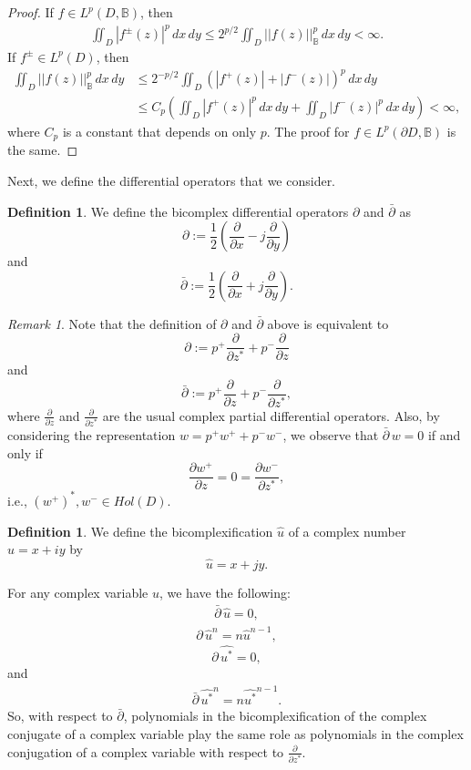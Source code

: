 \documentclass[suppldata]{interact}
\theoremstyle{plain}%
\theoremstyle{definition}
\newtheorem{deff}[theorem]{Definition}
\theoremstyle{remark}
\newtheorem{comm}{Remark}
\newcommand{\p}{\partial}
\newcommand{\dbar}{\bar\partial}
\newcommand{\bc}{\mathbb{B}}
\begin{document}
\begin{proof}
    If $f \in L^p(D, \bc)$, then 
    \begin{align*}
        \iint_D |f^\pm(z)|^p \,dx\,dy \leq 2^{p/2} \iint_D ||f(z)||_{\bc}^p \,dx\,dy < \infty. 
    \end{align*}
    If $f^\pm \in L^p(D)$, then 
    \begin{align*}
        \iint_D ||f(z)||_{\bc}^p \,dx\,dy &\leq 2^{-p/2} \iint_D (|f^+(z)|+|f^-(z)|)^p\,dx\,dy \\
        &\leq C_p \left( \iint_D |f^+(z)|^p \,dx\,dy + \iint_D |f^-(z)|^p \,dx\,dy\right) < \infty,
    \end{align*}
    where $C_p$ is a constant that depends on only $p$. The proof for $f \in L^p(\p D,\bc)$ is the same. 

\end{proof}

Next, we define the differential operators that we consider. 

\begin{deff}
    We define the bicomplex differential operators $\p$ and $\dbar$ as 
    \[
        \p := \frac{1}{2} \left( \frac{\p}{\p x} - j \frac{\p }{\p y}\right)
    \]
    and
    \[
        \dbar := \frac{1}{2} \left( \frac{\p}{\p x} + j \frac{\p }{\p y}\right).
    \]
\end{deff}

\begin{comm}\label{minusfunctionisholo}
    Note that the definition of $\p$ and $\dbar$ above is equivalent to 
    \[
        \p:= p^+ \frac{\p}{\p z^*} + p^- \frac{\p }{\p z}
    \]
    and 
    \[
        \dbar := p^+ \frac{\p}{\p z} + p^- \frac{\p }{\p z^*},
    \]
    where $\frac{\p}{\p z}$ and $\frac{\p }{\p z^*}$ are the usual complex partial differential operators. Also, by considering the representation $w = p^+ w^+ + p^- w^-$, we observe that $\dbar \, w = 0$ if and only if 
    \[
        \frac{\p w^+}{\p z} = 0 = \frac{\p w^-}{\p z^*}, 
    \]
    i.e., $(w^+)^*,w^- \in Hol(D)$. 
\end{comm}



\begin{deff}
    We define the bicomplexification $\widehat{u}$ of a complex number $u = x + iy$ by 
    \[
        \widehat{u} = x + jy. 
    \]
\end{deff}

For any complex variable $u$, we have the following:
\begin{align*}
    \dbar \,\widehat{u} = 0,
\end{align*}
\begin{align*}
    \p \, \widehat{u}^n = n \widehat{u}^{n-1},
\end{align*}
\[
    \p \, \widehat{u^*} = 0,
\]
and 
\begin{align*}
    \dbar \,\widehat{u^*}^{n} = n \widehat{u^*}^{n-1}.
\end{align*}
So, with respect to $\dbar$, polynomials in the bicomplexification of the complex conjugate of a complex variable play the same role as polynomials in the complex conjugation of a complex variable with respect to $\frac{\p}{\p z^*}$. 
\end{document}
